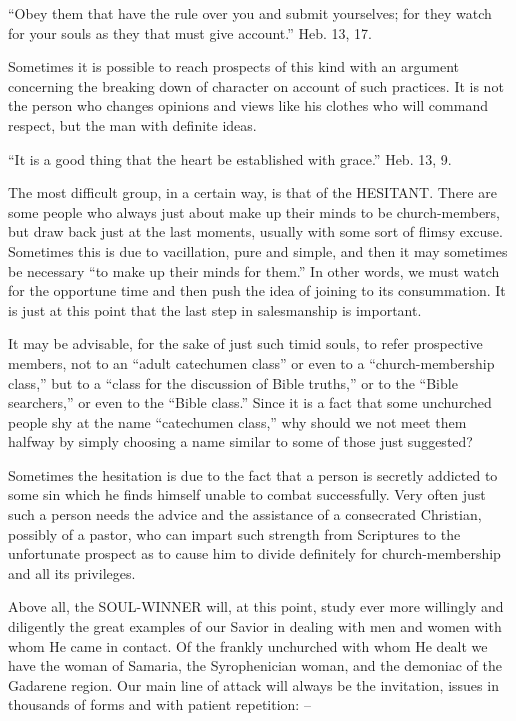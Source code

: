 \documentclass[
]{book}
\begin{document}
``Obey them that have the rule over you and submit yourselves; for they watch for your souls as they that must give account.'' Heb. 13, 17.

Sometimes it is possible to reach prospects of this kind with an argument concerning the breaking down of character on account of such practices. It is not the person who changes opinions and views like his clothes who will command respect, but the man with definite ideas.

``It is a good thing that the heart be established with grace.'' Heb. 13, 9.

The most difficult group, in a certain way, is that of the HESITANT. There are some people who always just about make up their minds to be church-members, but draw back just at the last moments, usually with some sort of flimsy excuse. Sometimes this is due to vacillation, pure and simple, and then it may sometimes be necessary ``to make up their minds for them.'' In other words, we must watch for the opportune time and then push the idea of joining to its consummation. It is just at this point that the last step in salesmanship is important.

It may be advisable, for the sake of just such timid souls, to refer prospective members, not to an ``adult catechumen class'' or even to a ``church-membership class,'' but to a ``class for the discussion of Bible truths,'' or to the ``Bible searchers,'' or even to the ``Bible class.'' Since it is a fact that some unchurched people shy at the name ``catechumen class,'' why should we not meet them halfway by simply choosing a name similar to some of those just suggested?

Sometimes the hesitation is due to the fact that a person is secretly addicted to some sin which he finds himself unable to combat successfully. Very often just such a person needs the advice and the assistance of a consecrated Christian, possibly of a pastor, who can impart such strength from Scriptures to the unfortunate prospect as to cause him to divide definitely for church-membership and all its privileges.

Above all, the SOUL-WINNER will, at this point, study ever more willingly and diligently the great examples of our Savior in dealing with men and women with whom He came in contact. Of the frankly unchurched with whom He dealt we have the woman of Samaria, the Syrophenician woman, and the demoniac of the Gadarene region. Our main line of attack will always be the invitation, issues in thousands of forms and with patient repetition: --
\end{document}
